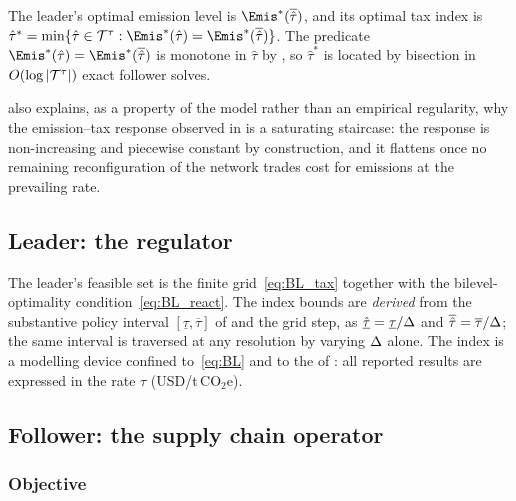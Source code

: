 \begin{corollary}
\label{cor:threshold}
The leader's optimal emission level is
$\Emis^{*}(\overline{\hat\tau})$, and its optimal tax index is
$\hat\tau^{*}=\min\{\hat\tau\in\taxgrid:
\Emis^{*}(\hat\tau)=\Emis^{*}(\overline{\hat\tau})\}$. The predicate
$\Emis^{*}(\hat\tau)=\Emis^{*}(\overline{\hat\tau})$ is monotone in
$\hat\tau$ by , so $\hat\tau^{*}$ is located by
bisection in $O(\log|\mathcal{T}^{\tau}|)$ exact follower solves.
\end{corollary}

 also explains, as a property of the model rather
than an empirical regularity, why the emission--tax response observed in
 is a saturating staircase: the response is
non-increasing and piecewise constant by construction, and it flattens
once no remaining reconfiguration of the network trades cost for
emissions at the prevailing rate.

\subsection{Leader: the regulator}
\label{sec:model:leader}

The leader's feasible set is the finite grid~\eqref{eq:BL_tax} together
with the bilevel-optimality condition~\eqref{eq:BL_react}. The index
bounds are \emph{derived} from the substantive policy interval
$[\underline{\tau},\overline{\tau}]$ of  and
the grid step, as
$\underline{\hat\tau}=\underline{\tau}/\Delta$ and
$\overline{\hat\tau}=\overline{\tau}/\Delta$; the same interval is
traversed at any resolution by varying $\Delta$ alone. The index is a
modelling device confined to~\eqref{eq:BL} and to the \DBP of
: all reported results are expressed in the rate
$\tau$ (USD/t\,CO$_2$e).

\subsection{Follower: the supply chain operator}
\label{sec:model:follower}

\subsubsection{Objective}
\label{sec:model:follower_obj}

